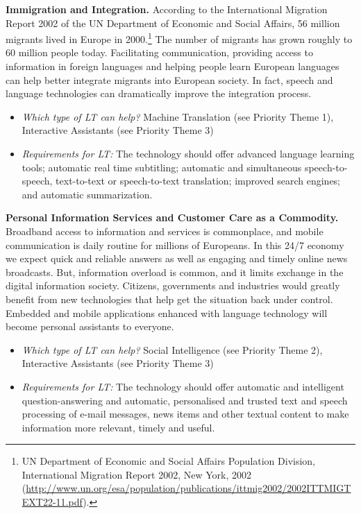 \begin{multicols}{2}
\textbf{Immigration and Integration.} According to the International Migration Report 2002 of the UN Department of Economic and Social Affairs, 56 million migrants lived in Europe in 2000.\footnote{UN Department of Economic and Social Affairs Population Division, International Migration Report 2002, New York, 2002 (\url{http://www.un.org/esa/population/publications/ittmig2002/2002ITTMIGTEXT22-11.pdf}).}  The number of migrants has grown roughly to 60 million people today. Facilitating communication, providing access to information in foreign languages and helping people learn European languages can help better integrate migrants into European society. In fact, speech and language technologies can dramatically improve the integration process. 

\begin{itemize}
\item \emph{Which type of LT can help?} Machine Translation (see Priority Theme 1), Interactive Assistants (see Priority Theme 3)
\item \emph{Requirements for LT:} The technology should offer advanced language learning tools; automatic real time subtitling; automatic and simultaneous speech-to-speech, text-to-text or speech-to-text translation; improved search engines; and automatic summarization.
\end{itemize}

\textbf{Personal Information Services and Customer Care as a Commodity.} Broadband access to information and services is commonplace, and mobile communication is daily routine for millions of Europeans. In this 24/7 economy we expect quick and reliable answers as well as engaging and timely online news broadcasts. But, information overload is common, and it limits exchange in the digital information society. Citizens, governments and industries would greatly benefit from new technologies that help get the situation back under control. Embedded and mobile applications enhanced with language technology will become personal assistants to everyone.

\begin{itemize}
\item \emph{Which type of LT can help?} Social Intelligence (see Priority Theme 2), Interactive Assistants (see Priority Theme 3)
\item \emph{Requirements for LT:} The technology should offer automatic and intelligent question-answering and automatic, personalised and trusted text and speech processing of e-mail messages, news items and other textual content to make information more relevant, timely and useful.
\end{itemize}


\end{multicols}
